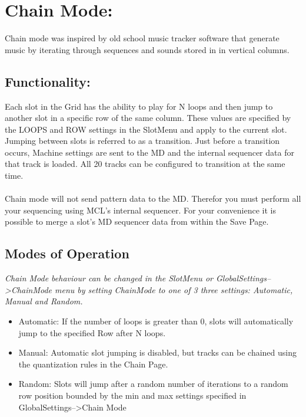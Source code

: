 \chapter{Chain Mode:}
Chain mode was inspired by old school music tracker software that generate music by iterating through sequences and sounds stored in in vertical columns.
\section{Functionality:}
Each slot in the Grid has the ability to play for N loops and then jump to another slot in a specific row of the same column.  These values are specified by the LOOPS and ROW settings in the SlotMenu and apply to the current slot. Jumping between slots is referred to as a transition. Just before a transition occurs, Machine settings are sent to the MD and the internal sequencer data for that track is loaded. All 20 tracks can be configured to transition at the same time.\\
 \\
Chain mode will not send pattern data to the MD. Therefor you must perform all your sequencing using MCL's internal sequencer. For your convenience it is possible to merge a slot's MD sequencer data from within the Save Page.
\section{Modes of Operation}
\textit{Chain Mode behaviour can be changed in the SlotMenu or GlobalSettings-->ChainMode menu by setting ChainMode to one of 3 three settings: Automatic, Manual and Random.}

\begin{itemize}
	\item Automatic: If the number of loops is greater than 0, slots will automatically jump to the specified Row after N loops.
	\item Manual: Automatic slot jumping is disabled, but tracks can be chained using the quantization rules in the Chain Page.
	\item Random: Slots will jump after a random number of iterations to a random row position bounded by the min and max settings specified in GlobalSettings-->Chain Mode
\end{itemize}


